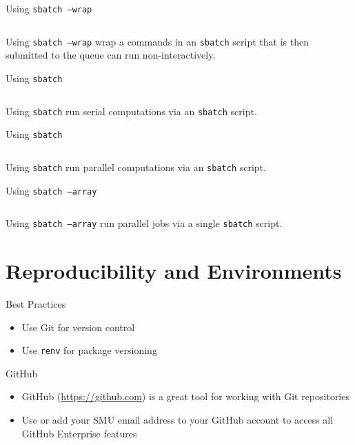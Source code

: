 \documentclass[aspectratio=169]{beamer}
\begin{document}
\begin{frame}{Using \texttt{sbatch --wrap}}
\begin{listing}[H]
\inputminted{sh}{examples/r_workflows/03_sbatch_wrap}
\caption{Using \texttt{sbatch --wrap} wrap a commands in an \texttt{sbatch} script that is then submitted to the queue can run non-interactively.}
\end{listing}
\end{frame}

\begin{frame}{Using \texttt{sbatch}}
\begin{listing}[H]
\inputminted{sh}{examples/r_workflows/04_sbatch_htc.sbatch}
\caption{Using \texttt{sbatch} run serial computations via an \texttt{sbatch} script.}
\end{listing}
\end{frame}

\begin{frame}{Using \texttt{sbatch}}
\begin{listing}[H]
\inputminted{sh}{examples/r_workflows/05_sbatch_standard-mem-s.sbatch}
\caption{Using \texttt{sbatch} run parallel computations via an \texttt{sbatch} script.}
\end{listing}
\end{frame}

\begin{frame}{Using \texttt{sbatch --array}}
\begin{listing}[H]
\inputminted{sh}{examples/r_workflows/06_sbatch_array.sbatch}
\caption{Using \texttt{sbatch --array} run parallel jobs via a single \texttt{sbatch} script.}
\end{listing}
\end{frame}

\section{Reproducibility and Environments}

\begin{frame}{Best Practices}
\begin{itemize}
\item Use Git for version control
\item Use \texttt{renv} for package versioning
\end{itemize}
\end{frame}

\begin{frame}{GitHub}
\begin{itemize}
\item GitHub (\url{https://github.com}) is a great tool for working with Git repositories
\item Use or add your SMU email address to your GitHub account to access all GitHub Enterprise features
\end{itemize}
\end{frame}
\end{document}
